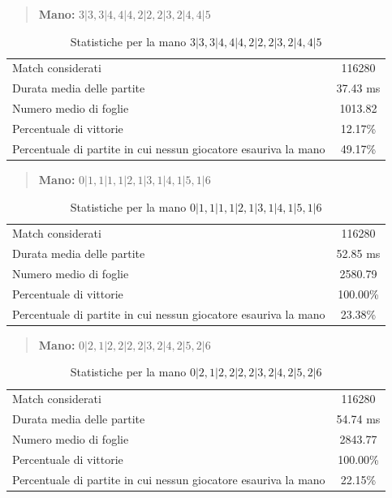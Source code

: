 \documentclass[a4paper,12pt]{report} %
\begin{document}
\begin{quote}
    \textbf{Mano:} \(3|3, 3|4, 4|4, 2|2, 2|3, 2|4, 4|5\)
\end{quote}

\begin{table}[h!]
    \centering
    \begin{tabular}{|l|c|}
        \hline
        Match considerati & 116280 \\
        Durata media delle partite & 37.43 ms \\
        Numero medio di foglie & 1013.82 \\
        Percentuale di vittorie & 12.17\% \\
        Percentuale di partite in cui nessun giocatore esauriva la mano & 49.17\% \\
        \hline
    \end{tabular}
    \caption{Statistiche per la mano \(3|3, 3|4, 4|4, 2|2, 2|3, 2|4, 4|5\)}
    \label{tab:stats_1}
\end{table}


\begin{quote}
    \textbf{Mano:} \(0|1, 1|1, 1|2, 1|3, 1|4, 1|5, 1|6\)
\end{quote}

\begin{table}[h!]
    \centering
    \begin{tabular}{|l|c|}
        \hline
        Match considerati & 116280 \\
        Durata media delle partite & 52.85 ms \\
        Numero medio di foglie &  2580.79 \\
        Percentuale di vittorie & 100.00\% \\
        Percentuale di partite in cui nessun giocatore esauriva la mano &  23.38\% \\
        \hline
    \end{tabular}
    \caption{Statistiche per la mano \(0|1, 1|1, 1|2, 1|3, 1|4, 1|5, 1|6\)}
    \label{tab:stats_tutti_1}
\end{table}


\begin{quote}
    \textbf{Mano:} \(0|2, 1|2, 2|2, 2|3, 2|4, 2|5, 2|6\)
\end{quote}

\begin{table}[h!]
    \centering
    \begin{tabular}{|l|c|}
        \hline
        Match considerati & 116280 \\
        Durata media delle partite &  54.74 ms \\
        Numero medio di foglie &  2843.77 \\
        Percentuale di vittorie & 100.00\% \\
        Percentuale di partite in cui nessun giocatore esauriva la mano &  22.15\% \\
        \hline
    \end{tabular}
    \caption{Statistiche per la mano \(0|2, 1|2, 2|2, 2|3, 2|4, 2|5, 2|6\)}
    \label{tab:stats_tutti_2}
\end{table}
\end{document}
